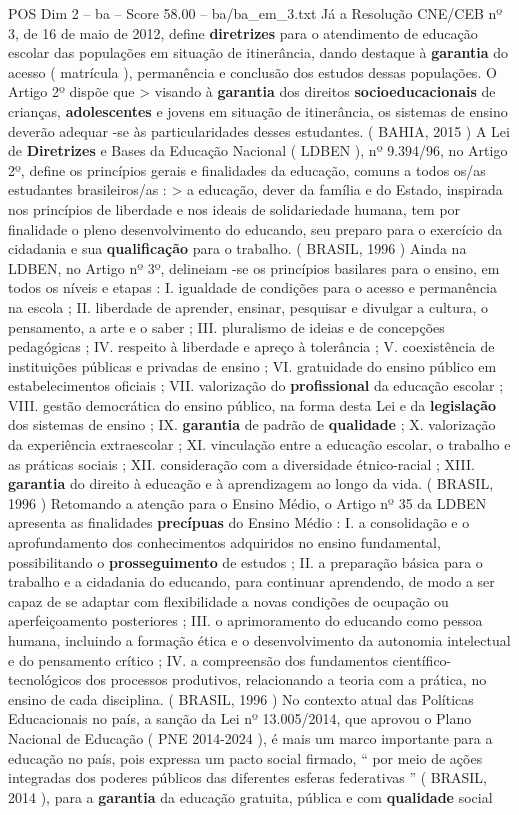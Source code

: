 \begin{textsample}{POS Dim 2 – ba – Score 58.00 – ba/ba\_em\_3.txt}
Já a Resolução CNE/CEB nº 3, de 16 de maio de 2012, define \textbf{diretrizes} para o atendimento de educação escolar das populações em situação de itinerância, dando destaque à \textbf{garantia} do acesso ( matrícula ), permanência e conclusão dos estudos dessas populações.
O Artigo 2º dispõe que > visando à \textbf{garantia} dos direitos \textbf{socioeducacionais} de crianças, \textbf{adolescentes} e jovens em situação de itinerância, os sistemas de ensino deverão adequar -se às particularidades desses estudantes. ( BAHIA, 2015 ) A Lei de \textbf{Diretrizes} e Bases da Educação Nacional ( LDBEN ), nº 9.394/96, no Artigo 2º, define os princípios gerais e finalidades da educação, comuns a todos os/as estudantes brasileiros/as : > a educação, dever da família e do Estado, inspirada nos princípios de liberdade e nos ideais de solidariedade humana, tem por finalidade o pleno desenvolvimento do educando, seu preparo para o exercício da cidadania e sua \textbf{qualificação} para o trabalho. ( BRASIL, 1996 ) Ainda na LDBEN, no Artigo nº 3º, delineiam -se os princípios basilares para o ensino, em todos os níveis e etapas : I. igualdade de condições para o acesso e permanência na escola ; II. liberdade de aprender, ensinar, pesquisar e divulgar a cultura, o pensamento, a arte e o saber ; III. pluralismo de ideias e de concepções pedagógicas ; IV. respeito à liberdade e apreço à tolerância ; V. coexistência de instituições públicas e privadas de ensino ; VI. gratuidade do ensino público em estabelecimentos oficiais ; VII. valorização do \textbf{profissional} da educação escolar ; VIII. gestão democrática do ensino público, na forma desta Lei e da \textbf{legislação} dos sistemas de ensino ; IX. \textbf{garantia} de padrão de \textbf{qualidade} ; X. valorização da experiência extraescolar ; XI. vinculação entre a educação escolar, o trabalho e as práticas sociais ; XII. consideração com a diversidade étnico-racial ; XIII. \textbf{garantia} do direito à educação e à aprendizagem ao longo da vida. ( BRASIL, 1996 ) Retomando a atenção para o Ensino Médio, o Artigo nº 35 da LDBEN apresenta as finalidades \textbf{precípuas} do Ensino Médio : I. a consolidação e o aprofundamento dos conhecimentos adquiridos no ensino fundamental, possibilitando o \textbf{prosseguimento} de estudos ; II. a preparação básica para o trabalho e a cidadania do educando, para continuar aprendendo, de modo a ser capaz de se adaptar com flexibilidade a novas condições de ocupação ou aperfeiçoamento posteriores ; III. o aprimoramento do educando como pessoa humana, incluindo a formação ética e o desenvolvimento da autonomia intelectual e do pensamento crítico ; IV. a compreensão dos fundamentos científico-tecnológicos dos processos produtivos, relacionando a teoria com a prática, no ensino de cada disciplina. ( BRASIL, 1996 ) No contexto atual das Políticas Educacionais no país, a sanção da Lei nº 13.005/2014, que aprovou o Plano Nacional de Educação ( PNE 2014-2024 ), é mais um marco importante para a educação no país, pois expressa um pacto social firmado, “ por meio de ações integradas dos poderes públicos das diferentes esferas federativas ” ( BRASIL, 2014 ), para a \textbf{garantia} da educação gratuita, pública e com \textbf{qualidade} social 
\end{textsample}
